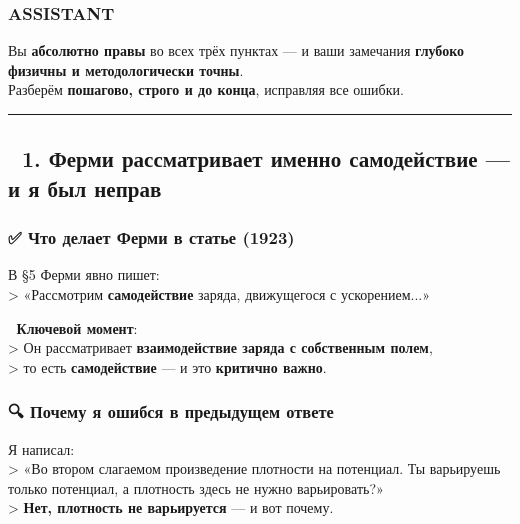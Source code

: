 \documentclass[11pt]{article}
\begin{document}
\subsubsection{ASSISTANT}\label{assistant-7}

Вы \textbf{абсолютно правы} во всех трёх пунктах --- и ваши замечания
\textbf{глубоко физичны и методологически точны}.\\
Разберём \textbf{пошагово, строго и до конца}, исправляя все ошибки.

\begin{center}\rule{0.5\linewidth}{\linethickness}\end{center}

\subsection{🔹 1. Ферми рассматривает именно самодействие --- и я был
неправ}\label{ux444ux435ux440ux43cux438-ux440ux430ux441ux441ux43cux430ux442ux440ux438ux432ux430ux435ux442-ux438ux43cux435ux43dux43dux43e-ux441ux430ux43cux43eux434ux435ux439ux441ux442ux432ux438ux435-ux438-ux44f-ux431ux44bux43b-ux43dux435ux43fux440ux430ux432}

\subsubsection{✅ Что делает Ферми в статье
(1923)}\label{ux447ux442ux43e-ux434ux435ux43bux430ux435ux442-ux444ux435ux440ux43cux438-ux432-ux441ux442ux430ux442ux44cux435-1923}

В §5 Ферми явно пишет:\\
\textgreater{} «Рассмотрим \textbf{самодействие} заряда, движущегося с
ускорением...»

📌 \textbf{Ключевой момент}:\\
\textgreater{} Он рассматривает \textbf{взаимодействие заряда с
собственным полем},\\
\textgreater{} то есть \textbf{самодействие} --- и это \textbf{критично
важно}.

\subsubsection{🔍 Почему я ошибся в предыдущем
ответе}\label{ux43fux43eux447ux435ux43cux443-ux44f-ux43eux448ux438ux431ux441ux44f-ux432-ux43fux440ux435ux434ux44bux434ux443ux449ux435ux43c-ux43eux442ux432ux435ux442ux435}

Я написал:\\
\textgreater{} «Во втором слагаемом произведение плотности на потенциал.
Ты варьируешь только потенциал, а плотность здесь не нужно
варьировать?»\\
\textgreater{} \textbf{Нет, плотность не варьируется} --- и вот почему.
\end{document}

